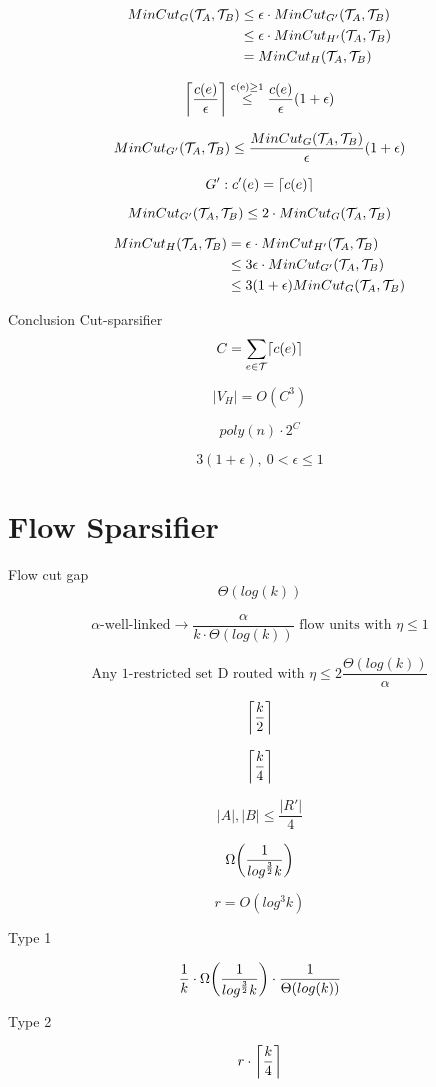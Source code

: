 \documentclass[headsepline,footsepline,footinclude=false,oneside,fontsize=11pt,paper=a4,listof=totoc,bibliography=totoc]{scrbook} %
\begin{document}
\begin{align*}
MinCut_{G}(\terminalOutSet_A, \terminalOutSet_B) & \leq \epsilon \cdot MinCut_{G'}(\terminalOutSet_A, \terminalOutSet_B) \\
& \leq \epsilon \cdot MinCut_{H'}(\terminalOutSet_A, \terminalOutSet_B)\\
& = MinCut_{H}(\terminalOutSet_A, \terminalOutSet_B)
\end{align*}

	
\[
\ceil[\bigg]{\frac{c(e)}{\epsilon}} \overset{\mathrm{c(e)\geq 1}}{\leq} \frac{c(e)}{\epsilon}(1 + \epsilon)
\]

\[
MinCut_{G'}(\terminalOutSet_A, \terminalOutSet_B) \leq \frac{MinCut_{G}(\terminalOutSet_A, \terminalOutSet_B)}{\epsilon}(1 + \epsilon)
\]

\[
G': c'(e) = \ceil{c(e)}
\]

\[
MinCut_{G'}(\terminalOutSet_A, \terminalOutSet_B) \leq 2 \cdot MinCut_{G}(\terminalOutSet_A, \terminalOutSet_B)
\]

\begin{align*}
MinCut_{H}(\terminalOutSet_A, \terminalOutSet_B) & = \epsilon \cdot MinCut_{H'}(\terminalOutSet_A, \terminalOutSet_B) \\
& \leq 3\epsilon \cdot MinCut_{G'}(\terminalOutSet_A, \terminalOutSet_B)\\
& \leq 3(1+\epsilon) MinCut_{G}(\terminalOutSet_A, \terminalOutSet_B)
\end{align*}

Conclusion Cut-sparsifier
\[
C = \sum_{e \in \terminalOutSet} \ceil{c(e)}
\]

\[
|V_H| = O(C^3)
\]

\[
poly(n) \cdot 2^C
\]

\[
3(1 + \epsilon), \ 0 < \epsilon \leq 1
\]


\section{Flow Sparsifier}
Flow cut gap
\[
\Theta(log(k))
\]

\[
\alpha\text{-well-linked} \longrightarrow \frac{\alpha}{k\cdot\Theta(log(k))} \text{ flow units with }\eta \leq 1
\]

\[
\text{Any 1-restricted set D routed with }\eta \leq 2\frac{\Theta(log(k))}{\alpha}
\]

\[
\ceil[\bigg]{\frac{k}{2}}
\]

\[
\ceil[\bigg]{\frac{k}{4}}
\]

\[
|A|,|B| \leq \frac{|R'|}{4}
\]

\[
\weakLinked
\]

\[
r = O(log^3k)
\]

Type 1

\[
\frac{1}{k} \cdot \weakLinked \cdot \frac{1}{\flowCutGap}
\]

Type 2

\[
r \cdot \ceil[\bigg]{\frac{k}{4}}
\]
\end{document}
